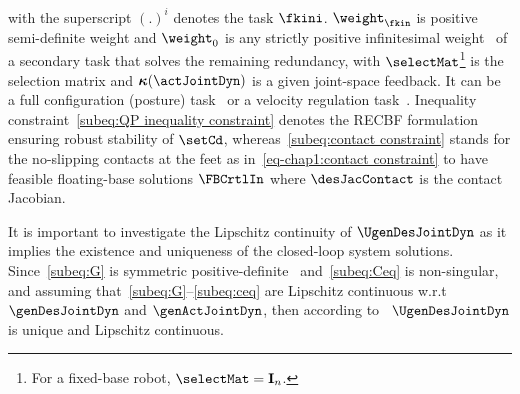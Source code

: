 \begin{subequations}
\end{subequations} with the superscript $(.)^i$ denotes the task $\fkini$. $\weight_{\fkin}$ is positive semi-definite weight and $\weight_0$ is any strictly positive infinitesimal weight~\cite[Lemma~2]{bouyarmane2018tac} of a secondary task that solves the remaining redundancy, with $\selectMat$\footnote{For a fixed-base robot, $\selectMat= \mathbf{I}_n$.} is the selection matrix and  $\boldsymbol{\kappa}(\actJointDyn)$ is a given joint-space feedback. It can be  a full configuration (posture) task~\cite{bouyarmane2011iros} or a velocity regulation task~\cite{basso2020ifac}. Inequality constraint~\eqref{subeq:QP inequality constraint} denotes the RECBF formulation ensuring robust stability of $\setCd$, whereas~\cref{subeq:contact constraint} stands for the no-slipping contacts at the feet as in~\cref{eq-chap1:contact constraint}  to have  feasible floating-base solutions $\FBCrtlIn$ where $\desJacContact$ is the contact Jacobian.

It is important to investigate the Lipschitz continuity of $\UgenDesJointDyn$ as it implies the existence and uniqueness of the closed-loop system solutions. Since~\cref{subeq:G} is symmetric positive-definite~\cite[Lemma~2]{bouyarmane2018tac} and~\cref{subeq:Ceq} is non-singular, and assuming that~\cref{subeq:G}--\cref{subeq:ceq} are Lipschitz continuous w.r.t $\genDesJointDyn$ and $\genActJointDyn$, then according to~\cite[Theorem~1]{morris2013cdc}\cite[Theorem~3]{ames2017tac}  $\UgenDesJointDyn$ is unique and Lipschitz continuous.  

